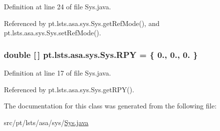 Definition at line 24 of file Sys.\+java.



Referenced by pt.\+lsts.\+asa.\+sys.\+Sys.\+get\+Ref\+Mode(), and pt.\+lsts.\+asa.\+sys.\+Sys.\+set\+Ref\+Mode().

\hypertarget{classpt_1_1lsts_1_1asa_1_1sys_1_1Sys_a89e85c508c7aa491c390961763b0666e}{}
\subsubsection[{R\+P\+Y}]{\setlength{\rightskip}{0pt plus 5cm}double \mbox{[}$\,$\mbox{]} pt.\+lsts.\+asa.\+sys.\+Sys.\+R\+P\+Y = \{ 0., 0., 0. \}\hspace{0.3cm}{\ttfamily [private]}}\label{classpt_1_1lsts_1_1asa_1_1sys_1_1Sys_a89e85c508c7aa491c390961763b0666e}


Definition at line 17 of file Sys.\+java.



Referenced by pt.\+lsts.\+asa.\+sys.\+Sys.\+get\+R\+P\+Y().



The documentation for this class was generated from the following file\+:\begin{DoxyCompactItemize}
\item 
src/pt/lsts/asa/sys/\hyperlink{Sys_8java}{Sys.\+java}\end{DoxyCompactItemize}
